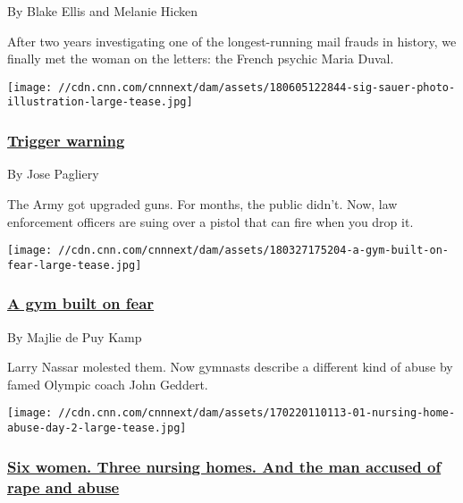 By Blake Ellis and Melanie Hicken

After two years investigating one of the longest-running mail frauds in
history, we finally met the woman on the letters: the French psychic
Maria Duval.

\href{https://www.cnn.com/interactive/2018/06/investigates/sig-sauer-p320-drop-fire/}{}

\texttt{[image: //cdn.cnn.com/cnnnext/dam/assets/180605122844-sig-sauer-photo-illustration-large-tease.jpg]}

\hypertarget{trigger-warning}{%
\subsubsection{\texorpdfstring{\href{https://www.cnn.com/interactive/2018/06/investigates/sig-sauer-p320-drop-fire/}{Trigger
warning}}{Trigger warning}}\label{trigger-warning}}

By Jose Pagliery

The Army got upgraded guns. For months, the public didn't. Now, law
enforcement officers are suing over a pistol that can fire when you drop
it.

\href{https://www.cnn.com/interactive/2018/03/investigates/john-geddert-abuse/}{}

\texttt{[image: //cdn.cnn.com/cnnnext/dam/assets/180327175204-a-gym-built-on-fear-large-tease.jpg]}

\hypertarget{a-gym-built-on-fear}{%
\subsubsection{\texorpdfstring{\href{https://www.cnn.com/interactive/2018/03/investigates/john-geddert-abuse/}{A
gym built on fear}}{A gym built on fear}}\label{a-gym-built-on-fear}}

By Majlie de Puy Kamp

Larry Nassar molested them. Now gymnasts describe a different kind of
abuse by famed Olympic coach John Geddert.

\href{https://www.cnn.com/interactive/2017/02/health/nursing-home-aide-rape-charges/}{}

\texttt{[image: //cdn.cnn.com/cnnnext/dam/assets/170220110113-01-nursing-home-abuse-day-2-large-tease.jpg]}

\hypertarget{six-women-three-nursing-homes-and-the-man-accused-of-rape-and-abuse}{%
\subsubsection{\texorpdfstring{\href{https://www.cnn.com/interactive/2017/02/health/nursing-home-aide-rape-charges/}{Six
women. Three nursing homes. And the man accused of rape and
abuse}}{Six women. Three nursing homes. And the man accused of rape and abuse}}\label{six-women-three-nursing-homes-and-the-man-accused-of-rape-and-abuse}}

